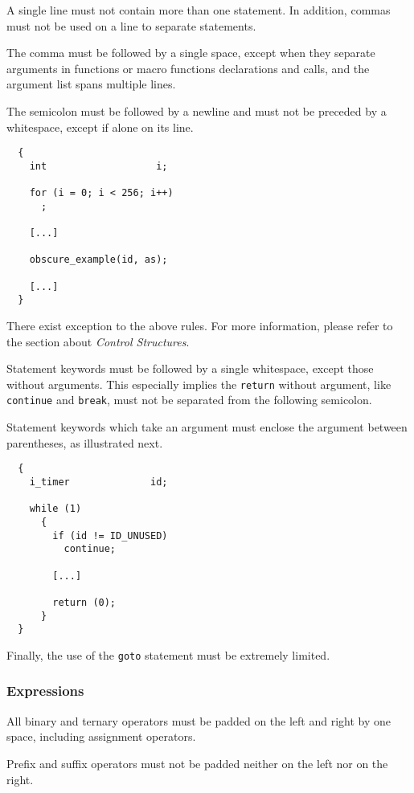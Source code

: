 A single line must not contain more than one statement. In addition, commas
must not be used on a line to separate statements.

The comma must be followed by a single space, except when they separate
arguments in functions or macro functions declarations and calls, and the
argument list spans multiple lines.

The semicolon must be followed by a newline and must not be preceded by
a whitespace, except if alone on its line.

\begin{verbatim}
  {
    int                   i;

    for (i = 0; i < 256; i++)
      ;

    [...]

    obscure_example(id, as);

    [...]
  }
\end{verbatim}

There exist exception to the above rules. For more information, please
refer to the section about \textit{Control Structures}.

Statement keywords must be followed by a single whitespace, except
those without arguments. This especially implies the \texttt{return} without
argument, like \texttt{continue} and \texttt{break}, must not be separated
from the following semicolon.

Statement keywords which take an argument must enclose the argument
between parentheses, as illustrated next.

\begin{verbatim}
  {
    i_timer              id;

    while (1)
      {
        if (id != ID_UNUSED)
          continue;

        [...]

        return (0);
      }
  }
\end{verbatim}

Finally, the use of the \texttt{goto} statement must be extremely limited.


\subsubsection{Expressions}

All binary and ternary operators must be padded on the left and right by
one space, including assignment operators.

Prefix and suffix operators must not be padded neither on the left nor on
the right.

